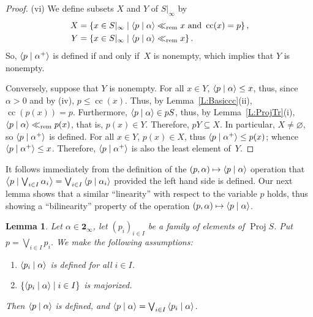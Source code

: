 \documentclass[psamsfonts,reqno]{memo-l}
\theoremstyle{plain}
\newtheorem{lemma}{Lemma}[section]
\theoremstyle{definition}
\theoremstyle{remark}
\numberwithin{equation}{section}
\newcommand{\Cn}{\mathbf{2}_{\infty}}
\renewcommand{\iff}{if and only if}
\newcommand{\es}{\varnothing}
\newcommand{\rem}{\ll_{\mathrm{rem}}}
\newcommand{\scal}[2]{\left\langle\nobreak#1\nobreak\mid\nobreak#2
\nobreak\right\rangle}
\newcommand{\DI}[1]{#1|_{\infty}}
\DeclareMathOperator{\cc}{cc}
\DeclareMathOperator{\BB}{Proj}
\newcommand{\set}[1]{\{#1\}}
\newcommand{\Set}[1]{\left\{#1\right\}}
\newcommand{\setm}[2]{\set{#1\mid#2}}
\newcommand{\Setm}[2]{\Set{#1\mid#2}}
\newcommand{\famm}[2]{(#1)_{#2}}
\begin{document}
\begin{proof}
(vi) We define subsets $X$ and $Y$ of $\DI{S}$ by
   \begin{align*}
   X&=\Setm{x\in\DI{S}}{\scal{p}{\alpha}\rem x\text{ and }\cc(x)=p},\\
   Y&=\Setm{x\in\DI{S}}{\scal{p}{\alpha}\rem x}.
   \end{align*}
So, $\scal{p}{\alpha^+}$ is defined \iff\ $X$ is nonempty, which implies
that $Y$ is nonempty.

Conversely, suppose that $Y$ is nonempty. For all $x\in Y$,
$\scal{p}{\alpha}\leq x$, thus, since $\alpha>0$ and by (iv), $p\leq\cc(x)$.
Thus, by Lemma~\ref{L:Basiccc}(ii), $\cc(p(x))=p$. Furthermore,
$\scal{p}{\alpha}\in pS$, thus, by Lemma~\ref{L:ProjTr}(i),
$\scal{p}{\alpha}\rem p(x)$, that is, $p(x)\in Y$. Therefore, $pY\subseteq
X$. In particular, $X\ne\es$, so $\scal{p}{\alpha^+}$ is defined. For all
$x\in Y$, $p(x)\in X$, thus $\scal{p}{\alpha^+}\leq p(x)$; whence
$\scal{p}{\alpha^+}\leq x$. Therefore, $\scal{p}{\alpha^+}$ is also the
least element of~$Y$.
\end{proof}

It follows immediately from the definition of the
$(p,\alpha)\mapsto\scal{p}{\alpha}$ operation that
$\scal{p}{\bigvee_{i\in I}\alpha_i}=
\bigvee_{i\in I}\scal{p}{\alpha_i}$ provided the left hand side is defined.
Our next lemma shows that a similar ``linearity'' with respect to the
variable $p$ holds, thus showing a ``bilinearity'' property of the
operation $(p,\alpha)\mapsto\scal{p}{\alpha}$.

\begin{lemma}\label{L:*bilin}
Let $\alpha\in\Cn$, let $\famm{p_i}{i\in I}$ be a family of elements
of\index{pzzroj@$\BB{S}$}
$\BB{S}$. Put $p=\bigvee_{i\in I}p_i$. We make the following
assumptions:
\begin{enumerate}
\item $\scal{p_i}{\alpha}$ is defined for all $i\in I$.

\item $\setm{\scal{p_i}{\alpha}}{i\in I}$ is majorized.
\end{enumerate}
Then $\scal{p}{\alpha}$ is defined, and
$\scal{p}{\alpha}=\bigvee_{i\in I}\scal{p_i}{\alpha}$.

\end{lemma}
\end{document}
